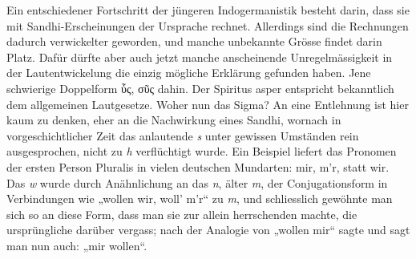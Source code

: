 {Ein entschiedener Fortschritt der jüngeren Indogermanistik besteht darin, dass sie mit Sandhi-Erscheinungen der Ursprache rechnet. Allerdings sind die Rechnungen dadurch verwickelter geworden, und manche unbekannte Grösse findet darin Platz. Dafür dürfte aber auch jetzt manche anscheinende Unregelmässigkeit in der Lautentwickelung die einzig mögliche Erklärung gefunden haben.  Jene schwierige Doppelform ὗς, σῦς  dahin. Der Spiritus asper entspricht bekanntlich dem allgemeinen Lautgesetze. Woher nun das Sigma? An eine Entlehnung ist hier kaum zu denken, eher an die Nachwirkung eines Sandhi, wornach in vorgeschichtlicher Zeit das anlautende \textit{s} unter gewissen Umständen rein ausgesprochen, nicht zu \textit{h} verflüchtigt wurde.  Ein  Beispiel liefert das Pronomen der ersten Person Pluralis in vielen deutschen Mundarten: mir, m’r, statt wir. Das \textit{w} wurde durch Anähnlichung an das \textit{n}, älter \textit{m}, der Conjugationsform in Verbindungen wie „wollen \label{sp.203} wir, woll’ m’r“ zu \textit{m}, und schliesslich gewöhnte man sich so an diese Form, dass man sie zur allein herrschenden machte, die ursprüngliche darüber vergass; nach der Analogie von „wollen mir“ sagte und sagt man nun auch: „mir wollen“. 

}
